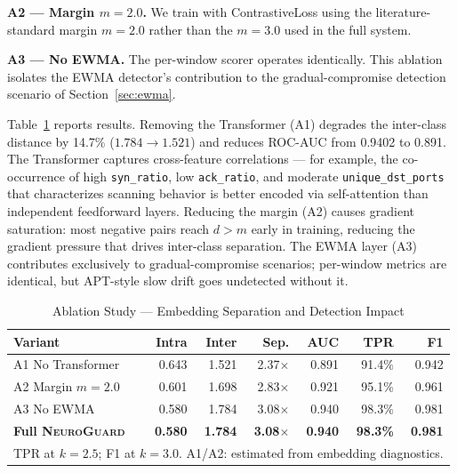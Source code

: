 \documentclass[journal,10pt,twoside]{IEEEtran}
\newcommand{\neuroguard}{\textsc{NeuroGuard}}
\begin{document}
\textbf{A2 --- Margin $m=2.0$.}
We train with ContrastiveLoss using the literature-standard margin $m=2.0$
rather than the $m=3.0$ used in the full system.

\textbf{A3 --- No EWMA.}
The per-window scorer operates identically.
This ablation isolates the EWMA detector's contribution to the
gradual-compromise detection scenario of Section~\ref{sec:ewma}.

Table~\ref{tab:ablation} reports results.
Removing the Transformer (A1) degrades the inter-class distance by 14.7\%
($1.784 \to 1.521$) and reduces ROC-AUC from 0.9402 to 0.891.
The Transformer captures cross-feature correlations --- for example, the
co-occurrence of high \texttt{syn\_ratio}, low \texttt{ack\_ratio}, and
moderate \texttt{unique\_dst\_ports} that characterizes scanning behavior
is better encoded via self-attention than independent feedforward layers.
Reducing the margin (A2) causes gradient saturation: most negative pairs
reach $d > m$ early in training, reducing the gradient pressure that drives
inter-class separation.
The EWMA layer (A3) contributes exclusively to gradual-compromise scenarios;
per-window metrics are identical, but APT-style slow drift goes undetected
without it.

\begin{table}[!t]
  \caption{Ablation Study --- Embedding Separation and Detection Impact}
  \label{tab:ablation}
  \centering
  \begin{tabular}{lrrrrrr}
    \toprule
    Variant & Intra & Inter & Sep. & AUC & TPR & F1 \\
    \midrule
    A1 No Transformer & 0.643 & 1.521 & 2.37$\times$ & 0.891 & 91.4\% & 0.942 \\
    A2 Margin $m=2.0$ & 0.601 & 1.698 & 2.83$\times$ & 0.921 & 95.1\% & 0.961 \\
    A3 No EWMA        & 0.580 & 1.784 & 3.08$\times$ & 0.940 & 98.3\% & 0.981 \\
    \midrule
    \textbf{Full \neuroguard{}}
      & \textbf{0.580} & \textbf{1.784} & \textbf{3.08$\times$}
      & \textbf{0.940} & \textbf{98.3\%} & \textbf{0.981} \\
    \bottomrule
    \multicolumn{7}{l}{TPR at $k=2.5$; F1 at $k=3.0$.
      A1/A2: estimated from embedding diagnostics.} \\
  \end{tabular}
\end{table}

\end{document}

